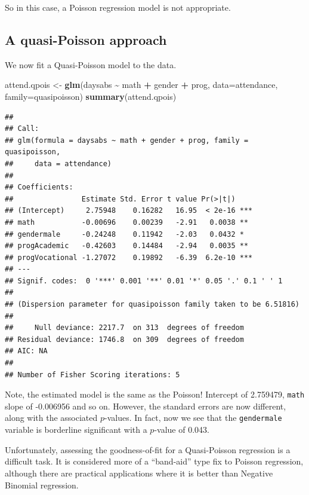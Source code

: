 \documentclass[
]{book}
\newenvironment{Shaded}{\begin{snugshade}}{\end{snugshade}}
\newcommand{\AttributeTok}[1]{\textcolor[rgb]{0.13,0.29,0.53}{#1}}
\newcommand{\FunctionTok}[1]{\textcolor[rgb]{0.13,0.29,0.53}{\textbf{#1}}}
\newcommand{\NormalTok}[1]{#1}
\newcommand{\OtherTok}[1]{\textcolor[rgb]{0.56,0.35,0.01}{#1}}
\newcommand{\SpecialCharTok}[1]{\textcolor[rgb]{0.81,0.36,0.00}{\textbf{#1}}}
\begin{document}
So in this case, a Poisson regression model is not appropriate.

\hypertarget{a-quasi-poisson-approach}{%
\subsection{A quasi-Poisson approach}\label{a-quasi-poisson-approach}}

We now fit a Quasi-Poisson model to the data.

\begin{Shaded}
\begin{Highlighting}[]
\NormalTok{attend.qpois }\OtherTok{\textless{}{-}} \FunctionTok{glm}\NormalTok{(daysabs }\SpecialCharTok{\textasciitilde{}}\NormalTok{ math }\SpecialCharTok{+}\NormalTok{ gender }\SpecialCharTok{+}\NormalTok{ prog, }\AttributeTok{data=}\NormalTok{attendance, }\AttributeTok{family=}\NormalTok{quasipoisson)}
\FunctionTok{summary}\NormalTok{(attend.qpois)}
\end{Highlighting}
\end{Shaded}

\begin{verbatim}
## 
## Call:
## glm(formula = daysabs ~ math + gender + prog, family = quasipoisson, 
##     data = attendance)
## 
## Coefficients:
##                Estimate Std. Error t value Pr(>|t|)    
## (Intercept)     2.75948    0.16282   16.95  < 2e-16 ***
## math           -0.00696    0.00239   -2.91   0.0038 ** 
## gendermale     -0.24248    0.11942   -2.03   0.0432 *  
## progAcademic   -0.42603    0.14484   -2.94   0.0035 ** 
## progVocational -1.27072    0.19892   -6.39  6.2e-10 ***
## ---
## Signif. codes:  0 '***' 0.001 '**' 0.01 '*' 0.05 '.' 0.1 ' ' 1
## 
## (Dispersion parameter for quasipoisson family taken to be 6.51816)
## 
##     Null deviance: 2217.7  on 313  degrees of freedom
## Residual deviance: 1746.8  on 309  degrees of freedom
## AIC: NA
## 
## Number of Fisher Scoring iterations: 5
\end{verbatim}

Note, the estimated model is the same as the Poisson! Intercept of 2.759479, \texttt{math} slope of -0.006956 and so on. However, the standard errors are now different, along with the associated \(p\)-values. In fact, now we see that the \texttt{gendermale} variable is borderline significant with a \(p\)-value of 0.043.

Unfortunately, assessing the goodness-of-fit for a Quasi-Poisson regression is a difficult task. It is considered more of a ``band-aid'' type fix to Poisson regression, although there are practical applications where it is better than Negative Binomial regression.
\end{document}

